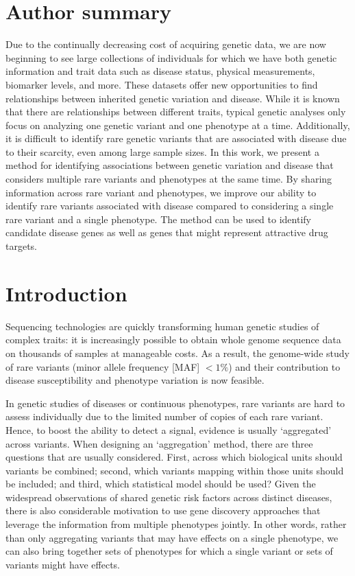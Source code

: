 \section*{Author summary}
Due to the continually decreasing cost of acquiring genetic data, we are now beginning to see large collections of individuals for which we have both genetic information and trait data such as disease status, physical measurements, biomarker levels, and more. These datasets offer new opportunities to find relationships between inherited genetic variation and disease. While it is known that there are relationships between different traits, typical genetic analyses only focus on analyzing one genetic variant and one phenotype at a time. Additionally, it is difficult to identify rare genetic variants that are associated with disease due to their scarcity, even among large sample sizes. In this work, we present a method for identifying associations between genetic variation and disease that considers multiple rare variants and phenotypes at the same time. By sharing information across rare variant and phenotypes, we improve our ability to identify rare variants associated with disease compared to considering a single rare variant and a single phenotype. The method can be used to identify candidate disease genes as well as genes that might represent attractive drug targets.

\linenumbers

\section*{Introduction}
Sequencing technologies are quickly transforming human genetic studies of complex traits: it is increasingly possible to obtain whole genome sequence data on thousands of samples at manageable costs. As a result, the genome-wide study of rare variants (minor allele frequency [MAF] $< 1\%$) and their contribution to disease susceptibility and phenotype variation is now feasible\cite{ifih1,altshuler2010map,rivas2011deep,10002012integrated}. 

In genetic studies of diseases or continuous phenotypes, rare variants are hard to assess individually due to the limited number of copies of each rare variant. Hence, to boost the ability to detect a signal, evidence is usually `aggregated' across variants. When designing an `aggregation' method, there are three questions that are usually considered. First, across which biological units should variants be combined; second, which variants mapping within those units should be included\cite{majithia2014rare}; and third, which statistical model should be used\cite{lee2014rare}? Given the widespread observations of shared genetic risk factors across distinct diseases, there is also considerable motivation to use gene discovery approaches that leverage the information from multiple phenotypes jointly. In other words, rather than only aggregating variants that may have effects on a single phenotype, we can also bring together sets of phenotypes for which a single variant or sets of variants might have effects. 

